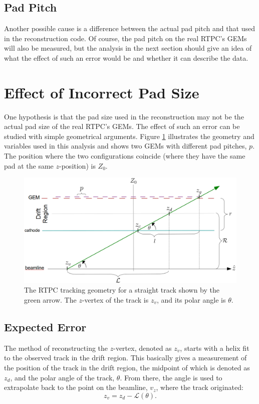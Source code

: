 \documentclass[amsmath,amssymb,notitlepage,11pt]{revtex4-1}
\begin{document}
\subsection{Pad Pitch}
Another possible cause is a difference between the actual pad pitch and that used in the reconstruction code.  Of course, the pad pitch on the real RTPC's GEMs will also be measured, but the analysis in the next section should give an idea of what the effect of such an error would be and whether it can describe the data.


\section{Effect of Incorrect Pad Size}\label{sec:padpitch}
One hypothesis is that the pad size used in the reconstruction may not be the actual pad size of the real RTPC's GEMs.  The effect of such an error can be studied with simple geometrical arguments.  Figure \ref{fig:diagram} illustrates the geometry and variables used in this analysis and shows two GEMs with different pad pitches, $p$.  The position where the two configurations coincide (where they have the same pad at the same $z$-position) is $Z_0$.
\begin{figure}[htbp]\centering
    \includegraphics[width=14cm]{pics/diagramB.png}
    \caption{The RTPC tracking geometry for a straight track shown by the green arrow.  The $z$-vertex of the track is $z_v$, and its polar angle is $\theta$.\label{fig:diagram}}
\end{figure}
\subsection{Expected Error}\label{sec:geopitch}
The method of reconstructing the $z$-vertex, denoted as $z_v$, starts with a helix fit to the observed track in the drift region.  This basically gives a measurement of the position of the track in the drift region, the midpoint of which is denoted as $z_d$, and the polar angle of the track, $\theta$. From there, the  angle is used to extrapolate back to the point on the beamline, $v_z$, where the track originated:
\begin{equation}
    z_v = z_d - \mathcal{L}(\theta).
    \label{}
\end{equation}
\end{document}
